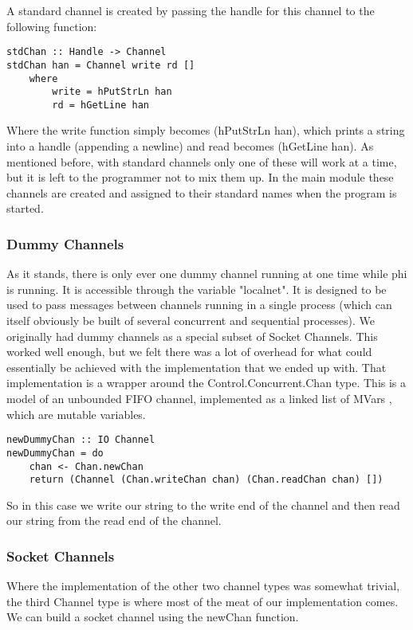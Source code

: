 A standard channel is created by passing the handle for this channel to the following function:

\begin{verbatim}
stdChan :: Handle -> Channel
stdChan han = Channel write rd []
    where
        write = hPutStrLn han
        rd = hGetLine han
\end{verbatim}
Where the write function simply becomes (hPutStrLn han), which prints a string into a handle (appending a newline) and read becomes (hGetLine han). As mentioned before, with standard channels only one of these will work at a time, but it is left to the programmer not to mix them up. In the main module these channels are created and assigned to their standard names when the program is started.

\subsubsection{Dummy Channels}
As it stands, there is only ever one dummy channel running at one time while phi is running. It is accessible through the variable "localnet". It is designed to be used to pass messages between channels running in a single process (which can itself obviously be built of several concurrent and sequential processes). We originally had dummy channels as a special subset of Socket Channels. This worked well enough, but we felt there was a lot of overhead for what could essentially be achieved
with the implementation that we ended up with. That implementation is a wrapper around the Control.Concurrent.Chan \cite{hack:chan} type. This is a model of an unbounded FIFO channel, implemented as a linked list of MVars \cite{hack:mvar}, which are mutable variables. 

\begin{verbatim}
newDummyChan :: IO Channel
newDummyChan = do
    chan <- Chan.newChan
    return (Channel (Chan.writeChan chan) (Chan.readChan chan) [])
\end{verbatim}
So in this case we write our string to the write end of the channel and then read our string from the read end of the channel.
\subsubsection{Socket Channels}
\label{sec:socketChannels}
Where the implementation of the other two channel types was somewhat trivial, the third Channel type is where most of the meat of our implementation comes. We can build a socket channel using the newChan function.

